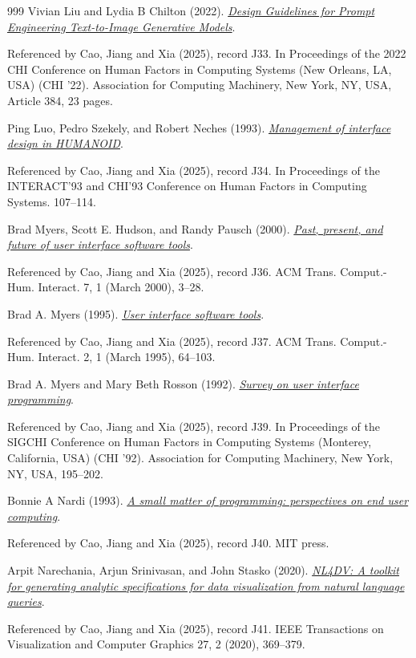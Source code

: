 \documentclass[11pt,letterpaper]{article}
\begin{document}
\begin{thebibliography}{999}
Vivian Liu and Lydia B Chilton (2022).
\href{https://doi.org/10.1145/3491102.3501825}{\emph{Design Guidelines for Prompt Engineering Text-to-Image Generative Models}}.
\par {\small Referenced by Cao, Jiang and Xia (2025), record J33. In Proceedings of the 2022 CHI Conference on Human Factors in Computing Systems (New Orleans, LA, USA) (CHI ’22). Association for Computing Machinery, New York, NY, USA, Article 384, 23 pages.}

Ping Luo, Pedro Szekely, and Robert Neches (1993).
\href{https://doi.org/10.1145/169059.169111}{\emph{Management of interface design in HUMANOID}}.
\par {\small Referenced by Cao, Jiang and Xia (2025), record J34. In Proceedings of the INTERACT’93 and CHI’93 Conference on Human Factors in Computing Systems. 107–114.}

Brad Myers, Scott E. Hudson, and Randy Pausch (2000).
\href{https://doi.org/10.1145/344949.344959}{\emph{Past, present, and future of user interface software tools}}.
\par {\small Referenced by Cao, Jiang and Xia (2025), record J36. ACM Trans. Comput.-Hum. Interact. 7, 1 (March 2000), 3–28.}

Brad A. Myers (1995).
\href{https://doi.org/10.1145/200968.200971}{\emph{User interface software tools}}.
\par {\small Referenced by Cao, Jiang and Xia (2025), record J37. ACM Trans. Comput.-Hum. Interact. 2, 1 (March 1995), 64–103.}

Brad A. Myers and Mary Beth Rosson (1992).
\href{https://doi.org/10.1145/142750.142789}{\emph{Survey on user interface programming}}.
\par {\small Referenced by Cao, Jiang and Xia (2025), record J39. In Proceedings of the SIGCHI Conference on Human Factors in Computing Systems (Monterey, California, USA) (CHI ’92). Association for Computing Machinery, New York, NY, USA, 195–202.}

Bonnie A Nardi (1993).
\href{https://doi.org/10.7551/mitpress/1020.001.0001}{\emph{A small matter of programming: perspectives on end user computing}}.
\par {\small Referenced by Cao, Jiang and Xia (2025), record J40. MIT press.}

Arpit Narechania, Arjun Srinivasan, and John Stasko (2020).
\href{https://arxiv.org/abs/2008.10723}{\emph{NL4DV: A toolkit for generating analytic specifications for data visualization from natural language queries}}.
\par {\small Referenced by Cao, Jiang and Xia (2025), record J41. IEEE Transactions on Visualization and Computer Graphics 27, 2 (2020), 369–379.}


\end{thebibliography}
\end{document}
